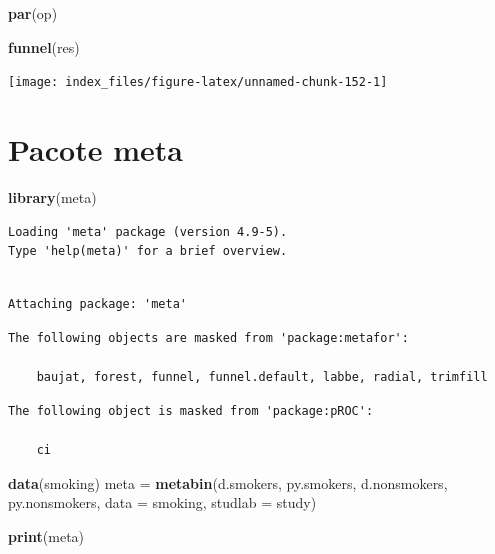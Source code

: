 \documentclass[12pt,brazil,oneside]{book}
\newenvironment{Shaded}{\begin{snugshade}}{\end{snugshade}}
\newcommand{\DataTypeTok}[1]{\textcolor[rgb]{0.13,0.29,0.53}{#1}}
\newcommand{\KeywordTok}[1]{\textcolor[rgb]{0.13,0.29,0.53}{\textbf{#1}}}
\newcommand{\NormalTok}[1]{#1}
\newcommand{\StringTok}[1]{\textcolor[rgb]{0.31,0.60,0.02}{#1}}
\begin{document}
\begin{Shaded}
\begin{Highlighting}[]
\KeywordTok{par}\NormalTok{(op)}
\end{Highlighting}
\end{Shaded}

\begin{Shaded}
\begin{Highlighting}[]
\KeywordTok{funnel}\NormalTok{(res)}
\end{Highlighting}
\end{Shaded}

\begin{center}\texttt{[image: index\_files/figure-latex/unnamed-chunk-152-1]} \end{center}

\hypertarget{pacote-meta}{%
\section{Pacote meta}\label{pacote-meta}}

\begin{Shaded}
\begin{Highlighting}[]
\KeywordTok{library}\NormalTok{(meta)}
\end{Highlighting}
\end{Shaded}

\begin{verbatim}
Loading 'meta' package (version 4.9-5).
Type 'help(meta)' for a brief overview.
\end{verbatim}

\begin{verbatim}

Attaching package: 'meta'
\end{verbatim}

\begin{verbatim}
The following objects are masked from 'package:metafor':

    baujat, forest, funnel, funnel.default, labbe, radial, trimfill
\end{verbatim}

\begin{verbatim}
The following object is masked from 'package:pROC':

    ci
\end{verbatim}

\begin{Shaded}
\begin{Highlighting}[]
\KeywordTok{data}\NormalTok{(smoking)}
\NormalTok{meta =}\StringTok{ }\KeywordTok{metabin}\NormalTok{(d.smokers, py.smokers,}
\NormalTok{               d.nonsmokers, py.nonsmokers,}
               \DataTypeTok{data =}\NormalTok{ smoking, }\DataTypeTok{studlab =}\NormalTok{ study)}

\KeywordTok{print}\NormalTok{(meta)}
\end{Highlighting}
\end{Shaded}
\end{document}
